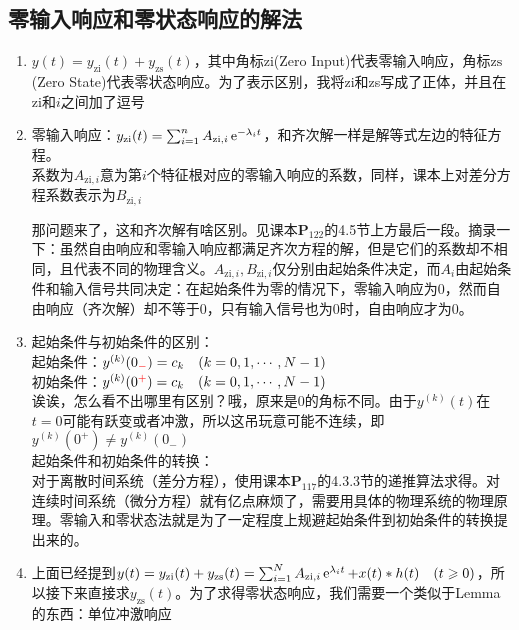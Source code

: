 \documentclass{article}
\newcommand\zi{\mathrm{zi}}
\newcommand\zs{\mathrm{zs}}
\begin{document}
\subsection{零输入响应和零状态响应的解法}
\begin{enumerate}[label=(\arabic*)]
	\item $y(t) = y_{\zi}(t)+y_{\zs}(t)$，其中角标$\zi$(Zero Input)代表零输入响应，角标$\zs$(Zero State)代表零状态响应。为了表示区别，我将zi和zs写成了正体，并且在zi和$i$之间加了逗号
	\item 零输入响应：$y_{\zi}(t) = \sum_{i=1}^{n}A_{\zi,i}\e^{-\lambda_i t}$，和齐次解一样是解等式左边的特征方程。\\
				系数为$A_{\zi,i}$意为第$i$个特征根对应的零输入响应的系数，同样，课本上对差分方程系数表示为$B_{\zi,i}$
				\begin{remark}
					那问题来了，这和齐次解有啥区别。见课本$\mathbf{P}_{122}$的4.5节上方最后一段。摘录一下：虽然自由响应和零输入响应都满足齐次方程的解，但是它们的{\red 系数}却不相同，且代表不同的物理含义。$A_{\zi,i},B_{\zi,i}$仅分别由{\red 起始}条件决定，而$A_{i}$由{\red 起始}条件和输入信号共同决定：在{\red 起始}条件为零的情况下，零输入响应为0，然而自由响应（齐次解）却不等于0，只有输入信号也为0时，自由响应才为0。
				\end{remark}
	\item {\red 起始}条件与{\red 初始}条件的区别：\\
				{\red 起始}条件：$y^{(k)}(0_{\color{red}-}) = c_k\quad (k=0,1,\cdots ,N-1)$\\
				{\red 初始}条件：$y^{(k)}(0^{\color{red}+}) = c_k\quad (k=0,1,\cdots ,N-1)$\\
				诶诶，怎么看不出哪里有区别？哦，原来是0的{\red 角标}不同。由于$y^{(k)}(t)$在$t=0$可能有跃变或者冲激，所以这吊玩意可能不连续，即$y^{(k)}(0^{+})\neq y^{(k)}(0_{-})$\\
				起始条件和初始条件的转换：\\
				对于离散时间系统（差分方程），使用课本$\mathbf{P}_{117}$的4.3.3节的递推算法求得。对连续时间系统（微分方程）就有亿点麻烦了，需要用具体的物理系统的物理原理。零输入和零状态法就是为了{\red 一定程度上规避}起始条件到初始条件的转换提出来的。
	\item 上面已经提到$y(t) = y_{\zi}(t)+y_{\zs}(t) = \sum_{i=1}^{N}A_{\zi,i}\e^{\lambda_i t}+x(t)*h(t)\quad (t\geq 0)$，所以接下来直接求$y_{\zs}(t)$。为了求得零状态响应，我们需要一个类似于Lemma的东西：单位冲激响应
\end{enumerate}
\end{document}
